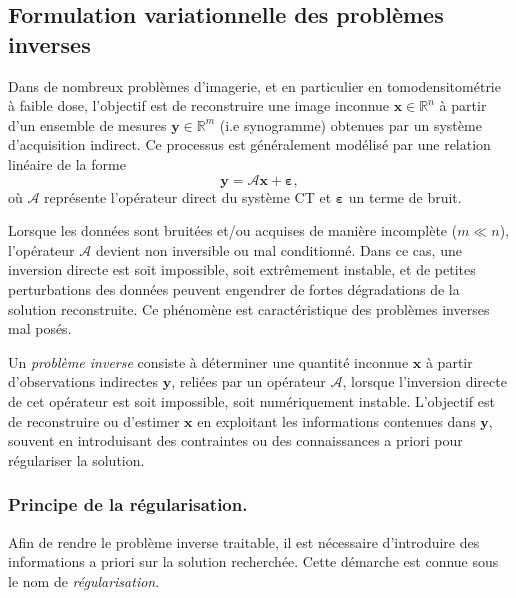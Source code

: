 \subsection{Formulation variationnelle des problèmes inverses}

Dans de nombreux problèmes d'imagerie, et en particulier en tomodensitométrie
à faible dose, l'objectif est de reconstruire une image inconnue
$\mathbf{x} \in \mathbb{R}^n$ à partir d'un ensemble de mesures
$\mathbf{y} \in \mathbb{R}^m$ (i.e synogramme) obtenues par un système d'acquisition indirect.
Ce processus est généralement modélisé par une relation linéaire de la forme
\begin{equation}
\mathbf{y} = \mathcal{A}\mathbf{x} + \boldsymbol{\varepsilon},
\end{equation}
où $\mathcal{A}$ représente l'opérateur direct du système CT et
$\boldsymbol{\varepsilon}$ un terme de bruit.

Lorsque les données sont bruitées et/ou acquises de manière incomplète
($m \ll n$), l'opérateur $\mathcal{A}$ devient non inversible ou mal conditionné.
Dans ce cas, une inversion directe est soit impossible, soit extrêmement
instable, et de petites perturbations des données peuvent engendrer de fortes
dégradations de la solution reconstruite. Ce phénomène est caractéristique des
problèmes inverses mal posés.

\begin{definition}
Un \emph{problème inverse} consiste à déterminer une quantité inconnue $\mathbf{x}$ à partir d'observations indirectes $\mathbf{y}$, reliées par un opérateur $\mathcal{A}$, lorsque l'inversion directe de cet opérateur est soit impossible, soit numériquement instable. L'objectif est de reconstruire ou d'estimer $\mathbf{x}$ en exploitant les informations contenues dans $\mathbf{y}$, souvent en introduisant des contraintes ou des connaissances a priori pour régulariser la solution.
\end{definition}

\subsubsection{Principe de la régularisation.}
Afin de rendre le problème inverse traitable, il est nécessaire d'introduire
des informations a priori sur la solution recherchée. Cette démarche est
connue sous le nom de \emph{régularisation}.

